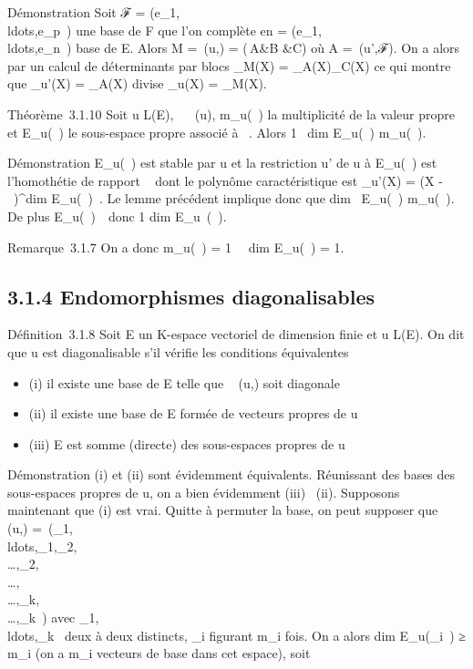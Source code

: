 \documentclass[]{article}
\begin{document}
Démonstration Soit ℱ =
(e_1,\\ldots,e_p~)
une base de F que l'on complète en  =
(e_1,\\ldots,e_n~)
base de E. Alors M =\
\mathrmMat (u,) = \left
(\matrix\,A&B
&C\right ) où A =\
\mathrmMat (u',ℱ). On a alors par un calcul de
déterminants par blocs \chi_M(X) = \chi_A(X)\chi_C(X)
ce qui montre que \chi_u'(X) = \chi_A(X) divise
\chi_u(X) = \chi_M(X).

Théorème~3.1.10 Soit u \in L(E), \lambda~
\in{}~(u),
m_u(\lambda~) la multiplicité de la valeur propre \lambda~ et E_u(\lambda~)
le sous-espace propre associé à \lambda~. Alors 1 \leq\
dim E_u(\lambda~) \leq m_u(\lambda~).

Démonstration E_u(\lambda~) est stable par u et la restriction u' de u
à E_u(\lambda~) est l'homothétie de rapport \lambda~ dont le polynôme
caractéristique est \chi_u'(X) = (X -
\lambda~)^dim E_u(\lambda~)~. Le lemme
précédent implique donc que dim~
E_u(\lambda~) \leq m_u(\lambda~). De plus
E_u(\lambda~)\neq~\0\,
donc 1 \leq dim E_u~(\lambda~).

Remarque~3.1.7 On a donc m_u(\lambda~) = 1 \rigtharrow~\
dim E_u(\lambda~) = 1.

\subsection{3.1.4 Endomorphismes diagonalisables}

Définition~3.1.8 Soit E un K-espace vectoriel de dimension finie et u \in
L(E). On dit que u est diagonalisable s'il vérifie les conditions
équivalentes

\begin{itemize}
\itemsep1pt\parskip0pt\parsep0pt
\item
  (i) il existe une base  de E telle que
  \mathrmMat~ (u,) soit
  diagonale
\item
  (ii) il existe une base \mathcal{E} de E formée de vecteurs propres de u
\item
  (iii) E est somme (directe) des sous-espaces propres de u
\end{itemize}

Démonstration (i) et (ii) sont évidemment équivalents. Réunissant des
bases des sous-espaces propres de u, on a bien évidemment (iii) \rigtharrow~(ii).
Supposons maintenant que (i) est vrai. Quitte à permuter la base, on
peut supposer que
\mathrmMat~ (u,\mathcal{E})
=\
\mathrmdiag(\lambda_1,\\ldots,\lambda_1,\lambda_2,\\\ldots,\lambda_2,\\\ldots,\\\ldots,\lambda_k,\\\ldots,\lambda_k~)
avec
\lambda_1,\\ldots,\lambda_k~
deux à deux distincts, \lambda_i figurant m_i fois. On a
alors dim E_u(\lambda_i~) ≥
m_i (on a m_i vecteurs de base dans cet espace), soit
\end{document}
